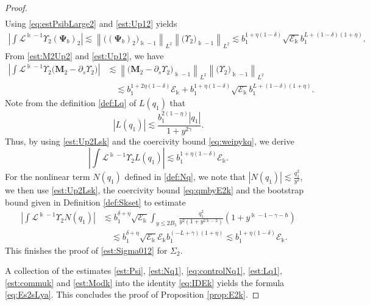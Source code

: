 \documentclass[11pt]{aims}
\theoremstyle{definition}
\numberwithin{equation}{section}
\begin{document}
\begin{proof}
\begin{align*}
\end{align*}
Using \eqref{eq:estPsibLarge2} and \eqref{est:Up12} yields 
\begin{align*}
\left|\int {\mathscr{L}}^{\Bbbk - 1}\Upsilon_2 (\mathbf{\Psi}_b)_2 \right| \lesssim \left\| \big((\mathbf{\Psi}_b)_2\big)_{\Bbbk - 1} \right\|_{L^2} \left\|\big(\Upsilon_2\big)_{\Bbbk - 1} \right\|_{L^2} \lesssim b_1^{1 + \eta(1 - \delta)}\sqrt{{\mathscr{E}}_\Bbbk}b_1^{L + (1 - \delta)(1 + \eta)}.
\end{align*}
From \eqref{est:M2Up2} and \eqref{est:Up12}, we have 
\begin{align*}
\left|\int {\mathscr{L}}^{\Bbbk - 1}\Upsilon_2 \big(\mathbf{M}_2 - {\partial_s} \Upsilon_2\big) \right| &\lesssim \left\| \big(\mathbf{M}_2 - {\partial_s} \Upsilon_2\big)_{\Bbbk - 1} \right\|_{L^2} \left\|\big(\Upsilon_2\big)_{\Bbbk - 1} \right\|_{L^2}\\
& \quad \lesssim b_1^{1 + 2\eta(1 - \delta)}{\mathscr{E}}_\Bbbk + b_1^{1 + \eta(1 - \delta)}\sqrt{{\mathscr{E}}_\Bbbk}b_1^{L + (1 - \delta)(1 + \eta)}.
\end{align*}
Note from the definition \eqref{def:Lq} of $L(q_1)$ that
$$|L(q_1)| \lesssim \frac{b_1^{2(1 - \eta)}|q_1|}{1 + y^{2\gamma}}.$$
Thus, by using \eqref{est:Up2Lsk} and the coercivity bound \eqref{eq:weipykq}, we derive
$$\left|\int {\mathscr{L}}^{\Bbbk - 1}\Upsilon_2 L(q_1)\right| \lesssim b_1^{1 + \eta(1 - \delta)} {\mathscr{E}}_\Bbbk.$$
For the nonlinear term $N(q_1)$ defined in \eqref{def:Nq}, we note that $|N(q_1)| \lesssim \frac{q_1^2}{y^2}$, we then use \eqref{est:Up2Lsk}, the coercivity bound \eqref{eq:qmbyE2k} and the bootstrap bound given in Definition \ref{def:Skset} to estimate 
\begin{align*}
\left|\int {\mathscr{L}}^{\Bbbk - 1}\Upsilon_2 N(q_1)\right| &\lesssim b_1^{\delta + \eta} \sqrt{{\mathscr{E}}_\Bbbk} \int_{y \leq 2B_1} \frac{q_1^2}{y^2(1 + y^{2\Bbbk - 2})} (1 + y^{\Bbbk - 1 - \gamma - \hbar})\\
& \quad \lesssim b_1^{\delta + \eta} \sqrt{{\mathscr{E}}_\Bbbk} {\mathscr{E}}_\Bbbk b_1^{(-L +\gamma)(1  +\eta)} \lesssim b_1^{1 + \eta(1 - \delta)}{\mathscr{E}}_\Bbbk.
\end{align*}
This finishes the proof of \eqref{est:Sigma012} for $\Sigma_2$. 

\medskip

A collection of the estimates \eqref{est:Psi}, \eqref{est:Nq1}, \eqref{eq:controlNq1}, \eqref{est:Lq1}, \eqref{est:commuk} and \eqref{est:Modk} into the identity \eqref{eq:IDEk} yields the formula \eqref{eq:Es2sLya}. This concludes the proof of Proposition \ref{prop:E2k}.
\end{proof}
\end{document}
